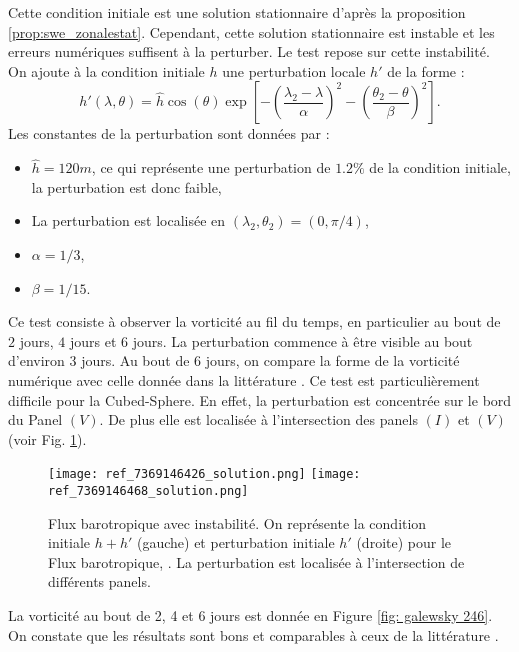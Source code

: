 Cette condition initiale est une solution stationnaire d'après la proposition \ref{prop:swe_zonalestat}. Cependant, cette solution stationnaire est instable et les erreurs numériques suffisent à la perturber. Le test repose sur cette instabilité. On ajoute à la condition initiale $h$ une perturbation locale $h'$ de la forme :
\begin{equation}
h'(\lambda, \theta) = \hat{h} \cos ( \theta ) \exp \left[ - \left( \dfrac{\lambda_2 - \lambda}{\alpha} \right)^2 - \left( \dfrac{\theta_2 - \theta}{\beta} \right)^2 \right].
\end{equation}
Les constantes de la perturbation sont données par :
\begin{itemize}
\item $\hat{h} = 120 \si{m}$, ce qui représente une perturbation de $1.2 \%$ de la condition initiale, la perturbation est donc faible,
\item La perturbation est localisée en $(\lambda_2, \theta_2) = (0, \pi/4)$,
\item $\alpha = 1/3$,
\item $\beta = 1/15$.
\end{itemize}

Ce test consiste à observer la vorticité au fil du temps, en particulier au bout de $2$ jours, $4$ jours et $6$ jours. La perturbation commence à être visible au bout d'environ 3 jours. Au bout de 6 jours, on compare la forme de la vorticité numérique avec celle donnée dans la littérature \cite{Galewsky2004, Chen2008}. Ce test est particulièrement difficile pour la Cubed-Sphere. En effet, la perturbation est concentrée sur le bord du Panel $(V)$. De plus elle est localisée à l'intersection des panels $(I)$ et $(V)$ (voir Fig. \ref{fig: initiale et perturbation Galewsky}).

\begin{figure}[htbp]
\begin{center}
\texttt{[image: ref\_7369146426\_solution.png]}
\texttt{[image: ref\_7369146468\_solution.png]}
\end{center}
\caption{Flux barotropique avec instabilité. On représente la condition initiale $h+h'$ (gauche) et perturbation initiale $h'$ (droite) pour le Flux barotropique, \cite{Galewsky2004}. La perturbation est localisée à l'intersection de différents panels.}
\label{fig: initiale et perturbation Galewsky}
\end{figure}

La vorticité au bout de 2, 4 et 6 jours est donnée en Figure \ref{fig: galewsky 246}. On constate que les résultats sont bons et comparables à ceux de la littérature \cite{Chen2008, Galewsky2004, Nair2005}. 

